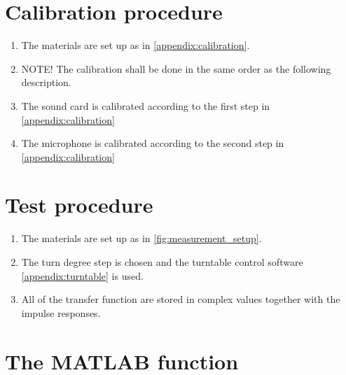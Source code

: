 %

\section*{Calibration procedure}


\begin{enumerate}
\item The materials are set up as in \autoref{appendix:calibration}.
\item NOTE! The calibration shall be done in the same order as the following description.
\item The sound card is calibrated according to the first step in \autoref{appendix:calibration}   
\item The microphone is calibrated according to the second step in \autoref{appendix:calibration}
\end{enumerate}

\section*{Test procedure}


\begin{enumerate}
\item The materials are set up as in \autoref{fig:measurement_setup}.
\item The turn degree step is chosen and the turntable control software \autoref{appendix:turntable} is used.  
\item  All of the transfer function are stored in complex values together with the impulse responses.
\end{enumerate}



\section*{The MATLAB function}


